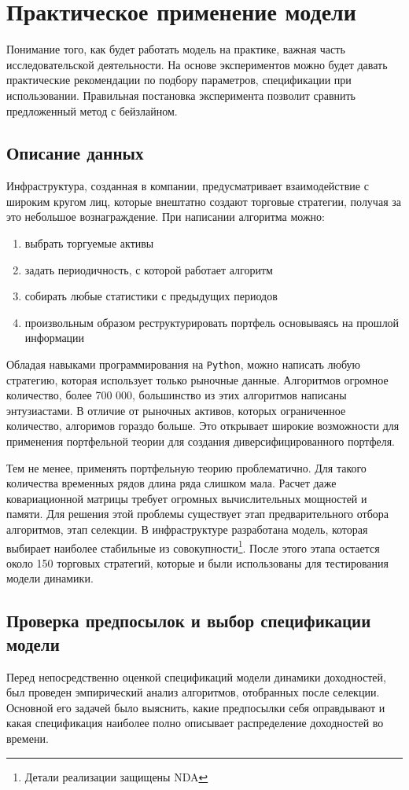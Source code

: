 \chapter{Практическое применение модели}
Понимание того, как будет работать модель на практике, важная часть исследовательской деятельности. На основе экспериментов можно будет давать практические рекомендации по подбору параметров, спецификации при использовании. Правильная постановка эксперимента позволит сравнить предложенный метод с бейзлайном.

\section{Описание данных}
Инфраструктура, созданная в компании, предусматривает взаимодействие с широким кругом лиц, которые внештатно создают торговые стратегии, получая за это небольшое вознаграждение. При написании алгоритма можно:
\begin{enumerate}
	\item выбрать торгуемые активы
	\item задать периодичность, с которой работает алгоритм
	\item собирать любые статистики с предыдущих периодов
	\item произвольным образом реструктурировать портфель основываясь на прошлой информации
\end{enumerate}
Обладая навыками программирования на \texttt{Python}, можно написать любую стратегию, которая использует только рыночные данные. Алгоритмов огромное количество, более 700 000, большинство из этих алгоритмов написаны энтузиастами. В отличие от рыночных активов, которых ограниченное количество, алгоримов гораздо больше. Это открывает широкие возможности для применения портфельной теории для создания диверсифицированного портфеля.

Тем не менее, применять портфельную теорию проблематично. Для такого количества временных рядов длина ряда слишком мала. Расчет даже ковариационной матрицы требует огромных вычислительных мощностей и памяти. Для решения этой проблемы существует этап предварительного отбора алгоритмов, этап селекции. В инфраструктуре разработана модель, которая выбирает наиболее стабильные из совокупности\footnote{Детали реализации защищены NDA}. После этого этапа остается около 150 торговых стратегий, которые и были использованы для тестирования модели динамики.

\section{Проверка предпосылок и выбор спецификации модели}
Перед непосредственно оценкой спецификаций модели динамики доходностей, был проведен эмпирический анализ алгоритмов, отобранных после селекции. Основной его задачей было выяснить, какие предпосылки себя оправдывают и какая спецификация наиболее полно описывает распределение доходностей во времени. 

